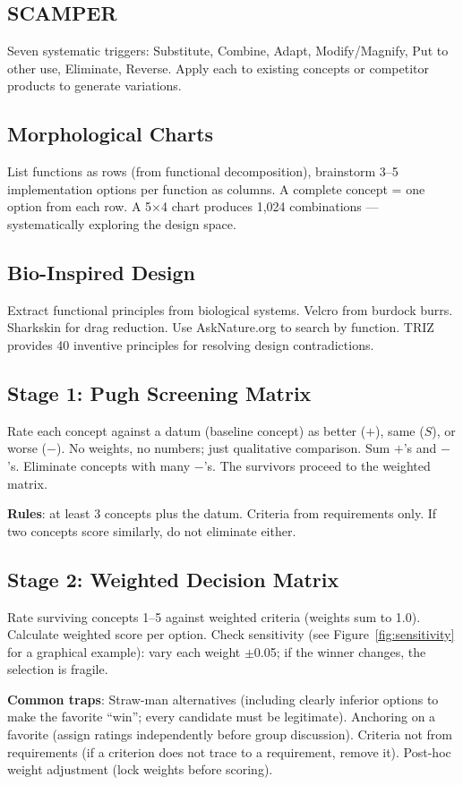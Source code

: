 \documentclass[11pt,letterpaper,twoside,openany]{book}
\begin{document}
\subsection{SCAMPER}
Seven systematic triggers: Substitute, Combine, Adapt, Modify/Magnify, Put to other use, Eliminate, Reverse. Apply each to existing concepts or competitor products to generate variations.

\subsection{Morphological Charts}
List functions as rows (from functional decomposition), brainstorm 3--5 implementation options per function as columns. A complete concept = one option from each row. A 5$\times$4 chart produces 1,024 combinations — systematically exploring the design space.

\subsection{Bio-Inspired Design}
Extract functional principles from biological systems. Velcro from burdock burrs. Sharkskin for drag reduction. Use AskNature.org to search by function. TRIZ provides 40 inventive principles for resolving design contradictions.


\subsection{Stage 1: Pugh Screening Matrix}
Rate each concept against a datum (baseline concept) as better ($+$), same ($S$), or worse ($-$). No weights, no numbers; just qualitative comparison. Sum $+$'s and $-$'s. Eliminate concepts with many $-$'s. The survivors proceed to the weighted matrix.

\textbf{Rules}: at least 3 concepts plus the datum. Criteria from requirements only. If two concepts score similarly, do not eliminate either.

\subsection{Stage 2: Weighted Decision Matrix}
Rate surviving concepts 1--5 against weighted criteria (weights sum to 1.0). Calculate weighted score per option. Check sensitivity (see Figure~\ref{fig:sensitivity} for a graphical example): vary each weight $\pm$0.05; if the winner changes, the selection is fragile.

\textbf{Common traps}: Straw-man alternatives (including clearly inferior options to make the favorite ``win''; every candidate must be legitimate). Anchoring on a favorite (assign ratings independently before group discussion). Criteria not from requirements (if a criterion does not trace to a requirement, remove it). Post-hoc weight adjustment (lock weights before scoring).
\end{document}
